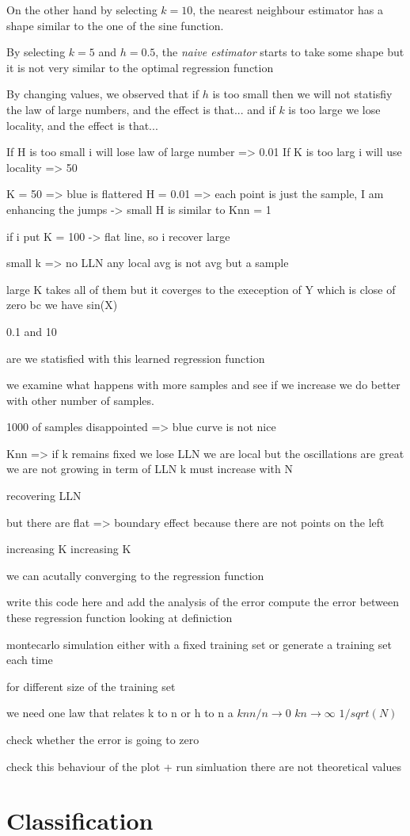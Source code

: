 On the other hand by selecting $k=10$, the nearest neighbour estimator has a shape similar to the one of the sine function.

By selecting $k = 5$ and $h=0.5$, the \textit{naive estimator} starts to take some shape but it is not very similar to the optimal regression function

By changing values, we observed that if $h$ is too small then we will not statisfiy the law of large numbers, and the effect is that...
and if $k$ is too large we lose locality, and the effect is that...

If H is too small i will lose law of large number => 0.01
If K is too larg i will use locality => 50

K = 50 => blue is flattered
H = 0.01 => each point is just the sample, I am enhancing the jumps
-> small H is similar to Knn = 1

if i put K = 100 -> flat line, so i recover large

small k => no LLN
any local avg is not avg but a sample

large K takes all of them but it coverges to the exeception of Y which is close of zero bc we have sin(X)

0.1 and 10

are we statisfied with this learned regression function

we examine what happens with more samples and see if we increase we do better with other number of samples.

1000 of samples
disappointed => blue curve is not nice

Knn =>
if k remains fixed we lose LLN
we are local but the oscillations are great
we are not growing in term of LLN
k must increase with N

recovering LLN

but there are flat => boundary effect because there are not points on the left

increasing K
increasing K

we can acutally converging to the regression function


write this code here and add the analysis of the error
compute the error between these regression function looking at definiction

montecarlo simulation
either with a fixed training set
or
generate a training set each time

for different size of the training set

we need one law that relates k to n or h to n
a
$knn / n \to 0$
$kn \to \infty$
$1/sqrt(N)$

check whether the error is going to zero

check this behaviour of the plot + run simluation
there are not theoretical values


\section{Classification}
